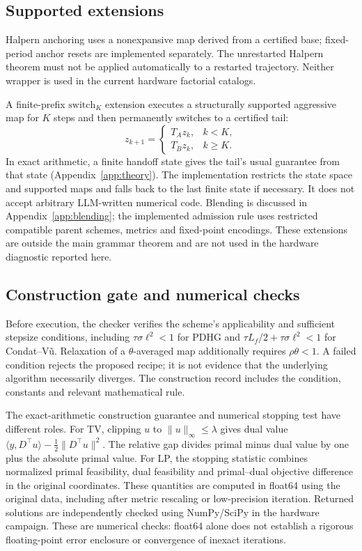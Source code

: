\subsection{Supported extensions}
\label{sec:mixing}

Halpern anchoring uses a nonexpansive map derived from a certified base;
fixed-period anchor resets are implemented separately. The unrestarted Halpern
theorem must not be applied automatically to a restarted trajectory. Neither
wrapper is used in the current hardware factorial catalogs.

A finite-prefix $\mathrm{switch}_K$ extension executes a structurally supported
aggressive map for $K$ steps and then permanently switches to a certified tail:
\begin{equation}
 z_{k+1}=\begin{cases}T_Az_k,&k<K,\\T_Bz_k,&k\geq K.\end{cases}
 \label{eq:switchk}
\end{equation}
In exact arithmetic, a finite handoff state gives the tail's usual guarantee
from that state (Appendix~\ref{app:theory}). The implementation restricts the
state space and supported maps and falls back to the last finite state if
necessary. It does not accept arbitrary LLM-written numerical code.
Blending is discussed in Appendix~\ref{app:blending}; the implemented admission
rule uses restricted compatible parent schemes, metrics and fixed-point
encodings. These extensions are outside the main grammar theorem and are not
used in the hardware diagnostic reported here.

\subsection{Construction gate and numerical checks}
\label{sec:gate}

Before execution, the checker verifies the scheme's applicability and sufficient
stepsize conditions, including $\tau\sigma\ell^2<1$ for PDHG and
$\tau L_f/2+\tau\sigma\ell^2<1$ for Condat--V\~u. Relaxation of a
$\theta$-averaged map additionally requires $\rho\theta<1$. A failed
condition rejects the proposed recipe; it is not evidence that the underlying
algorithm necessarily diverges. The construction record includes the condition,
constants and relevant mathematical rule.

The exact-arithmetic construction guarantee and numerical stopping test have
different roles. For TV, clipping $u$ to $\|u\|_\infty\leq\lambda$ gives
dual value $\langle y,D^\top u\rangle-\tfrac12\|D^\top u\|^2$.
The relative gap divides primal minus dual value by one plus the absolute
primal value. For LP, the stopping statistic combines normalized primal
feasibility, dual feasibility and primal--dual objective difference in the
original coordinates. These quantities are computed in float64 using the
original data, including after metric rescaling or low-precision iteration.
Returned solutions are independently checked using NumPy/SciPy in the hardware
campaign. These are numerical checks: float64 alone does not establish a
rigorous floating-point error enclosure or convergence of inexact iterations.

